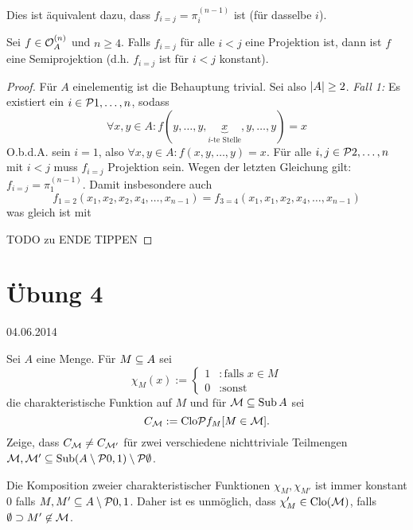 \documentclass{book}
\begin{document}
\begin{remark}
    Dies ist äquivalent dazu, dass $f_{i=j}=\pi_i^{(n-1)}$ ist (für dasselbe $i$).
\end{remark}

\begin{lemma}\label{semi-proj-unique-proj}
    Sei $f\in\mathcal{O}_A^{(n)}$ und $n\geq 4$. Falls $f_{i=j}$ für alle $i<j$ eine Projektion ist, dann ist $f$ eine Semiprojektion (d.h. $f_{i=j}$ ist für $i<j$ konstant).
\end{lemma}

\begin{proof}
    Für $A$ einelementig ist die Behauptung trivial. Sei also $\left|A\right|\geq 2$.
    \emph{Fall 1:} Es existiert ein $i\in\set{1,\ldots,n}$, sodass
    $$
    \forall x,y\in A: f(y,\ldots,y,\underbrace{x}_{\textrm{$i$-te Stelle}},y,\ldots,y)=x
    $$
    O.b.d.A. sein $i=1$, also $\forall x,y\in A:f(x,y,\ldots,y)=x$.
    Für alle $i,j\in\set{2,\ldots,n}$ mit $i<j$ muss $f_{i=j}$ Projektion sein. Wegen der letzten Gleichung gilt: $f_{i=j}=\pi_1^{(n-1)}$. Damit insbesondere auch
    $$
    f_{1=2}(x_1,x_2,x_2,x_4,\ldots,x_{n-1})=f_{3=4}(x_1,x_1,x_2,x_4,\ldots,x_{n-1})
    $$
    was gleich ist mit
  
    TODO zu ENDE TIPPEN
\end{proof}

\section{Übung 4}\hfill 04.06.2014

\begin{exercise}
    Sei $A$ eine Menge. Für $M\subseteq A$ sei
    $$
    \chi_M(x):=
    \begin{cases}
        1 &: \textrm{falls $x\in M$}\\
        0 &: \textrm{sonst}
    \end{cases}
    $$
    die charakteristische Funktion auf $M$ und für $\mathcal{M}\subseteq\mathop\mathrm{Sub}\nolimits A$ sei
    $$
    C_\cM := \Clo\set{f_M}[M\in\cM].
    $$
    Zeige, dass $C_{\mathcal{M}}\neq C_{\mathcal{M}'}$ für zwei verschiedene nichttriviale Teilmengen $\cM,\cM'\setleq \Sub(A\setminus\set{0,1})\setminus\set\emptyset$.
\end{exercise}
%
\begin{solution}
    Die Komposition zweier charakteristischer Funktionen $\chi_M, \chi_{M'}$ ist immer konstant $0$ falls $M,M'\setleq A\setminus\set{0,1}$. Daher ist es unmöglich, dass $\chi_M'\in\mathrm{Clo}(\mathcal{M})$, falls $\emptyset\supset M'\not\in\mathcal{M}$.
\end{solution}
\end{document}
